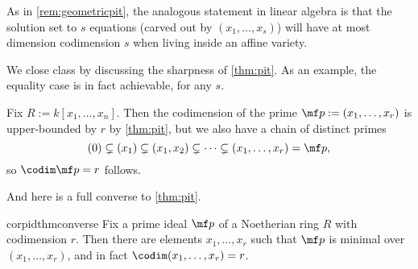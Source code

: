 \begin{remark}
	As in \autoref{rem:geometricpit}, the analogous statement in linear algebra is that the solution set to $s$ equations (carved out by $(x_1,\ldots,x_s)$) will have at most dimension codimension $s$ when living inside an affine variety.
\end{remark}
We close class by discussing the sharpness of \autoref{thm:pit}. As an example, the equality case is in fact achievable, for any $s$.
\begin{example}
	Fix $R:=k[x_1,\ldots,x_n]$. Then the codimension of the prime $\mf p:=(x_1,\ldots,x_r)$ is upper-bounded by $r$ by \autoref{thm:pit}, but we also have a chain of distinct primes
	\[(0)\subsetneq(x_1)\subsetneq(x_1,x_2)\subsetneq\cdots\subsetneq(x_1,\ldots,x_r)=\mf p,\]
	so $\codim\mf p=r$ follows.
\end{example}
And here is a full converse to \autoref{thm:pit}.
\begin{restatable}{cor}{pidthmconverse} \label{cor:pitconverse}
	Fix a prime ideal $\mf p$ of a Noetherian ring $R$ with codimension $r$. Then there are elements $x_1,\ldots,x_r$ such that $\mf p$ is minimal over $(x_1,\ldots,x_r)$, and in fact $\codim(x_1,\ldots,x_r)=r$.
\end{restatable}
